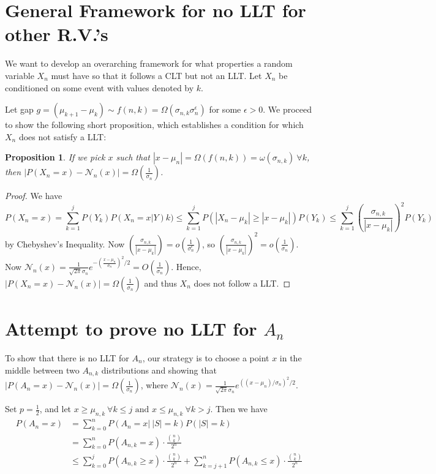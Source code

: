 \documentclass[12pt]{article} %
\newcommand{\p}[1]{\left(#1\right)}
\newcommand{\abs}[1]{\left\lvert#1\right\rvert}
\newtheorem{prop}[thm]{Proposition}
\theoremstyle{definition}
\theoremstyle{remark}
\begin{document}
\section{General Framework for no LLT for other R.V.'s}
We want to develop an overarching framework for what properties a random variable $X_n$ must have so that it follows a CLT but not an LLT. Let $X_n$ be conditioned on some event with values denoted by $k$. 

Let gap $g = (\mu_{k+1}-\mu_k) \sim f(n,k) = \Omega(\sigma_{n,k}\sigma_n^{\epsilon})$ for some $\epsilon >0$.
We proceed to show the following short proposition, which establishes a condition for which $X_n$ does not satisfy a LLT:
\begin{prop}
If we pick $x$ such that $\abs{x - \mu_n} = \Omega(f(n,k)) = \omega(\sigma_{n,k}) \ \forall k$, then $\abs{P(X_n = x) - \mathcal{N}_n(x)} = \Omega(\frac{1}{\sigma_n})$.
\end{prop}
\begin{proof} We have
\[P(X_n = x) = \sum_{k = 1}^j P(Y_k)P(X_n = x | Y)k) \leq \sum_{k = 1}^j P(\abs{X_n-\mu_k} \geq \abs{x-\mu_k}) P(Y_k) \leq \sum_{k=1}^j \p{\frac{\sigma_{n,k}}{\abs{x-\mu_k}}}^2 P(Y_k) \] by Chebyshev's Inequality.
Now $\p{\frac{\sigma_{n,k}}{\abs{x-\mu_k}}} = o(\frac{1}{\sigma_n^{\epsilon}})$, so $\p{\frac{\sigma_{n,k}}{\abs{x-\mu_k}}}^2 = o(\frac{1}{\sigma_n})$. Now $\mathcal{N}_n(x) = \frac{1}{\sqrt{2\pi}\sigma_n} e^{-\p{\frac{x-\mu_n}{\sigma_n}}^2/2} = O(\frac{1}{\sigma_n})$. Hence, $\abs{P(X_n = x) - \mathcal{N}_n(x)} = \Omega(\frac{1}{\sigma_n})$ and thus $X_n$ does not follow a LLT. 

\end{proof}



\section{Attempt to prove no LLT for $A_n$}

To show that there is no LLT for $A_n$, our strategy is to choose a point $x$ in the middle between two $A_{n,k}$ distributions and showing that $\abs{P(A_n = x) - \mathcal{N}_n(x)} = \Omega(\frac{1}{\sigma_n})$, where $\mathcal{N}_n(x) = \frac{1}{\sqrt{2\pi}\sigma_n} e^{((x-\mu_n)/\sigma_n)^{2}/2}$. 

Set $p = \frac{1}{2}$, and let $x \geq \mu_{n,k} \ \forall k \leq j \text{ and } x \leq \mu_{n,k} \ \forall k>j$. Then we have
\begin{align*}
P(A_n = x) &= \sum_{k = 0}^n P(A_n = x |\ |S| = k)P(|S| = k)\\
&= \sum_{k = 0}^n P(A_{n,k} = x) \cdot \frac{{n\choose k}}{2^n} \\
&\leq \sum_{k = 0}^j P(A_{n,k} \geq x) \cdot \frac{{n\choose k}}{2^n} + \sum_{k = j+1}^n P(A_{n,k} \leq x) \cdot \frac{{n\choose k}}{2^n}
\end{align*}
\end{document}
